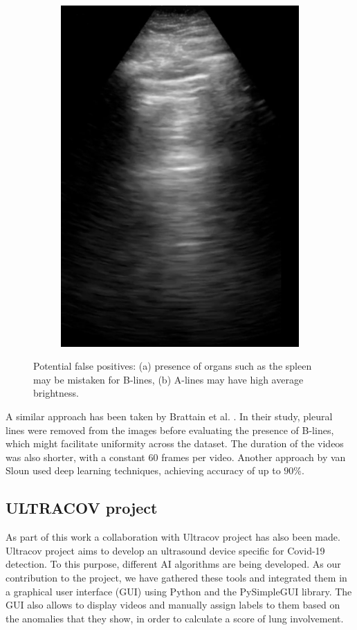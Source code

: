 \documentclass[11pt]{article} %
\begin{document}
\begin{figure}[h]
\begin{subfigure}{0.3\textwidth}
	\includegraphics[width=\textwidth]{figuras/bright_aline.png}
	\caption{}
	\end{subfigure}
	\caption{Potential false positives: (a) presence of organs such as the spleen may be mistaken for B-lines, (b) A-lines may have high average brightness.}
	\end{figure}
	
	
	A similar approach has been taken by Brattain et al. \cite{brattain}. In their study, pleural lines were removed from the images before evaluating the presence of B-lines, which might facilitate uniformity across the dataset. The duration of the videos was also shorter, with a constant 60 frames per video. Another approach by van Sloun \cite{vanSloun} used deep learning techniques, achieving accuracy of up to $90 \%$.
	
\subsection{ULTRACOV project}
	As part of this work a collaboration with Ultracov project has also been made. Ultracov project aims to develop an ultrasound device specific for Covid-19 detection. To this purpose, different AI algorithms are being developed. As our contribution to the project, we have gathered these tools and integrated them in a graphical user interface (GUI) using Python and the PySimpleGUI library. The GUI also allows to display videos and manually assign labels to them based on the anomalies that they show, in order to calculate a score of lung involvement. 
	
\end{document}
